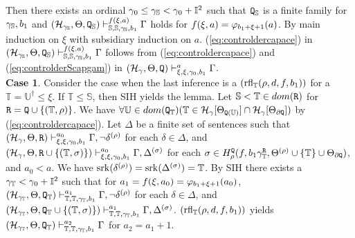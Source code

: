 \documentclass{article}
\newcommand{\mS}{\mathbb{S}}
\newcommand{\mI}{\mathbb{I}}
\newcommand{\mT}{\mathbb{T}}
\newcommand{\mU}{\mathbb{U}}
\begin{document}
Then there exists an ordinal $\gam_{0}\leq\gam_{\mS}<\gam_{0}+\mI^{2}$ such that
${\tt Q}_{\mS}$ is a finite family for $\gam_{\mS},b_{1}$ and
$
(\mathcal{H}_{\gam_{\mS}},\Tht,{\tt Q}_{\mS})
\vdash^{f(\xi,a)}_{\mS,\mS,\gam_{\mS},b_{1}}
\Gamma
$ holds for $f(\xi,a)=\varphi_{b_{1}+\xi+1}(a)$.
\elem
\bprf
By main induction on $\xi$ with subsidiary induction on $a$.
(\ref{eq:controldercapace}) in \\
$
(\mathcal{H}_{\gam_{\mS}},\Tht,{\tt Q}_{\mS})
\vdash^{f(\xi,a)}_{\mS,\mS,\gam_{\mS},b_{1}}
\Gamma
$
follows from (\ref{eq:controldercapace}) and (\ref{eq:controlderScapgam}) in $
(\mathcal{H}_{\gamma},\Theta,{\tt Q})
\vdash^{a}_{\xi,\xi,\gamma_{0},b_{1}}
\Gamma
$.
\\
\textbf{Case 1}.
Consider the case when the last inference is a $({\rm rfl}_{\mT}(\rho,d,f,b_{1}))$
for a $\mT=\mU^{\dagger}\leq\xi$.
If $\mT\leq\mS$, then SIH yields the lemma.
Let $\mS<\mT\in dom({\tt R})$ for ${\tt R}={\tt Q}\cup\{(\mT,\rho)\}$.
We have $\fal\mU\in dom({\tt Q}_{\mT})(\mT\in\calh_{\gam}[\Tht_{{\tt Q}(\mU)}]\cap\calh_{\gam}[\Tht_{\partial{\tt Q}}])$ by (\ref{eq:controldercapace}).
Let $\Delta$ be a finite set of sentences such that
 $(\mathcal{H}_{\gamma},\Theta,{\tt R})\vdash^{a_{0}}_{\xi,\xi,\gamma_{0},b_{1}}
\Gamma, \lnot\delta^{(\rho)}$
for each $\delta\in\Delta$, and
$
(\mathcal{H}_{\gamma},\Tht,
{\tt R}\cup\{(\mT,\sigma)\}
)\vdash^{a_{0}}_{\xi,\xi,\gam_{0},b_{1}}
\Gam,
\Delta^{(\sigma)}
$
for each $\sigma\in H^{{\tt Q}}_{\rho}(f,b_{1}\gamma_{\mT}^{{\tt R}},\Tht^{(\rho)}\cup\{\mT\}\cup\Tht_{\partial{\tt Q}})$, and 
$a_{0}<a$.
We have ${\rm srk}(\delta^{(\rho)})={\rm srk}(\Del^{(\sig)})=\mT$.
By SIH there exists a $\gam_{\mT}<\gam_{0}+\mI^{2}$ such that for $a_{1}=f(\xi,a_{0})=\varphi_{b_{1}+\xi+1}(a_{0})$, 
 $(\mathcal{H}_{\gam_{\mT}},\Tht,{\tt Q}_{\mT})\vdash^{a_{1}}_{\mT,\mT,\gam_{\mT},b_{1}}
\Gam, \lnot\delta^{(\rho)}$
for each $\delta\in\Delta$, and
$
(\mathcal{H}_{\gam_{\mT}},\Tht,
{\tt Q}_{\mT}\cup\{(\mT,\sigma)\}
)\vdash^{a_{1}}_{\mT,\mT,\gam_{\mT},b_{1}}
\Gam,
\Delta^{(\sigma)}
$.
$({\rm rfl}_{\mT}(\rho,d,f,b_{1}))$ yields
$
(\mathcal{H}_{\gam_{\mT}},\Tht,
{\tt Q}_{\mT}
)\vdash^{a_{2}}_{\mT,\mT,\gam_{\mT},b_{1}}
\Gam
$ for $a_{2}=a_{1}+1$.
\end{document}
